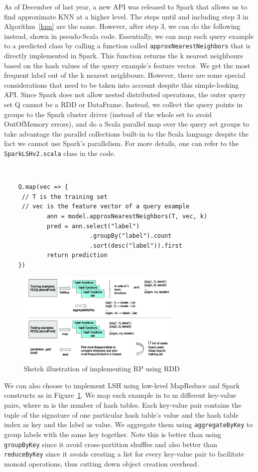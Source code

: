 \documentclass[letterpaper,twocolumn,10pt]{article}
\theoremstyle{definition}
\begin{document}
As of December of last year, a new API was released to Spark that allows us to find approximate KNN 
at a higher level. The steps until and including step 3 in Algorithm~\ref{knn} are the same. However, 
after step 3, we can do the following instead, shown in pseudo-Scala code. Essentially, we can map 
each query example to a predicted class by calling a function called \texttt{approxNearestNeighbors} 
that is directly implemented in Spark. This function returns the k nearest neighbours based on the 
hash values of the query example's feature vector. We get the most frequent label out of the k nearest 
neighbours. However, there are some special considerations that need to be 
taken into account despite this simple-looking API. Since Spark does not allow nested distributed 
operations, the outer query set Q cannot be a RDD or DataFrame. Instead, we collect the query points 
in groups to the Spark cluster driver (instead of the whole set to avoid OutOfMemory errors), and do a 
Scala parallel map over the query set groups to take advantage the parallel collections built-in to the 
Scala language despite the fact we cannot use Spark's parallelism. For more details, one can refer to 
the \texttt{SparkLSHv2.scala} class in the code. \\
 
{\tt \small
	\begin{verbatim}
	Q.map(vec => {
	 // T is the training set
	 // vec is the feature vector of a query example
			ann = model.approxNearestNeighbors(T, vec, k)
			pred = ann.select("label")
			            .groupBy("label").count
			            .sort(desc("label")).first
			return prediction
	})
	\end{verbatim}
}

\begin{figure}[H]
	\center
	\includegraphics[width=8cm]{rdd}
	\caption{Sketch illustration of implementing RP using RDD}
	\label{figure:rdd}
\end{figure}

We can also choose to implement LSH using low-level MapReduce and Spark constructs as in 
Figure~\ref{figure:rdd}. We map each example in to m different key-value pairs, where m is the number 
of hash tables. Each key-value pair contains the tuple of the signature of one particular hash table's 
value and the hash table index as key and the label as value. We aggregate them using 
\texttt{aggregateByKey} to group labels with the same key together. Note this is better than using 
\texttt{groupByKey} since it avoid cross-partition shuffles and also better than \texttt{reduceByKey} 
since it avoids creating a list for every key-value pair to facilitate monoid operations, thus cutting down 
object creation overhead. \\
\end{document}
